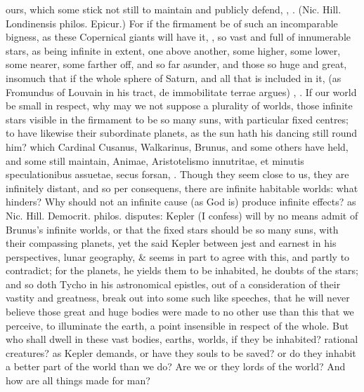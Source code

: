 {ours, which some stick not still to maintain and publicly defend,
, \etc{}. (Nic. Hill. Londinensis philos. Epicur.) For if the
firmament be of such an incomparable bigness, as these Copernical
giants will have it, , so vast and full
of innumerable stars, as being infinite in extent, one above another,
some higher, some lower, some nearer, some farther off, and so far
asunder, and those so huge and great, insomuch that if the whole sphere
of Saturn, and all that is included in it,  (as
Fromundus of Louvain in his tract, \textlatin{de immobilitate terrae argues})
, \etc{}. If our world
be small in respect, why may we not suppose a plurality of worlds,
those infinite stars visible in the firmament to be so many suns, with
particular fixed centres; to have likewise their subordinate planets,
as the sun hath his dancing still round him? which Cardinal Cusanus,
Walkarinus, Brunus, and some others have held, and some still maintain,
Animae, Aristotelismo innutritae, et minutis speculationibus assuetae,
secus forsan, \etc{}. Though they seem close to us, they are infinitely
distant, and so per consequens, there are infinite habitable worlds:
what hinders? Why should not an infinite cause (as God is) produce
infinite effects? as Nic. Hill. Democrit. philos. disputes: Kepler (I
confess) will by no means admit of Brunus's infinite worlds, or that
the fixed stars should be so many suns, with their compassing planets,
yet the said Kepler between jest and earnest in his perspectives,
lunar geography,  \&  seems
in part to agree with this, and partly to contradict; for the planets,
he yields them to be inhabited, he doubts of the stars; and so doth
Tycho in his astronomical epistles, out of a consideration of their
vastity and greatness, break out into some such like speeches, that he
will never believe those great and huge bodies were made to no other
use than this that we perceive, to illuminate the earth, a point
insensible in respect of the whole. But who shall dwell in these vast
bodies, earths, worlds,  if they be inhabited? rational
creatures? as Kepler demands, or have they souls to be saved? or do
they inhabit a better part of the world than we do? Are we or they
lords of the world? And how are all things made for man? }
